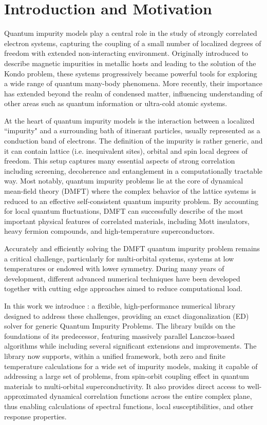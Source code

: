 \documentclass[edipack2.tex]{subfiles}
\begin{document}
\section{Introduction and Motivation}\label{SecIntro}


Quantum impurity models play a central role in the study of strongly correlated electron systems, capturing the coupling of a small number of localized degrees of freedom with extended non-interacting environment.   
Originally introduced to describe magnetic impurities in metallic hosts and leading to the solution of the Kondo problem, these systems progressively became powerful tools for exploring a wide range of quantum many-body phenomena. More recently, their importance has extended beyond the realm of condensed matter, influencing understanding of other areas such as quantum information or ultra-cold atomic systems. 

At the heart of quantum impurity models is the interaction between a localized ``impurity"  and a surrounding bath of itinerant particles, usually represented as a conduction band of electrons. The definition of the impurity is rather generic, and it can contain lattice (i.e. inequivalent sites), orbital and spin local degrees of freedom.
This setup captures many essential aspects of strong correlation including screening, decoherence and entanglement in a computationally tractable way. 
Most notably, quantum impurity problems lie at the core of dynamical mean-field theory (DMFT) where the complex behavior of the lattice systems is reduced to an effective self-consistent quantum impurity problem.  
By accounting for local quantum fluctuations, DMFT can successfully describe of the most important physical features of correlated materials, including Mott insulators, heavy fermion compounds, and high-temperature superconductors.  

Accurately and efficiently solving the DMFT quantum impurity problem remains a
critical challenge, particularly for multi-orbital systems, systems
at low temperatures or endowed with lower symmetry. During many years of development, different advanced numerical techniques have been developed together with cutting edge approaches aimed to reduce computational load.  

In this work we introduce  \NAME{}: a flexible, high-performance numerical library designed to address these challenges, providing an exact diagonalization (ED) solver for generic Quantum Impurity Problems. 
The library builds on the foundations of
its predecessor, featuring massively parallel Lanczos-based algorithms while including several significant extensions and 
improvements. The library now supports, within a unified framework, both zero and finite temperature calculations for a wide set of impurity models, making it capable of addressing a large set of problems, from spin-orbit coupling effect in quantum materials to multi-orbital superconductivity. It also provides direct
access to well-approximated dynamical correlation functions across the
entire complex plane, thus enabling calculations of spectral functions, local susceptibilities, and other response properties.
\end{document}
